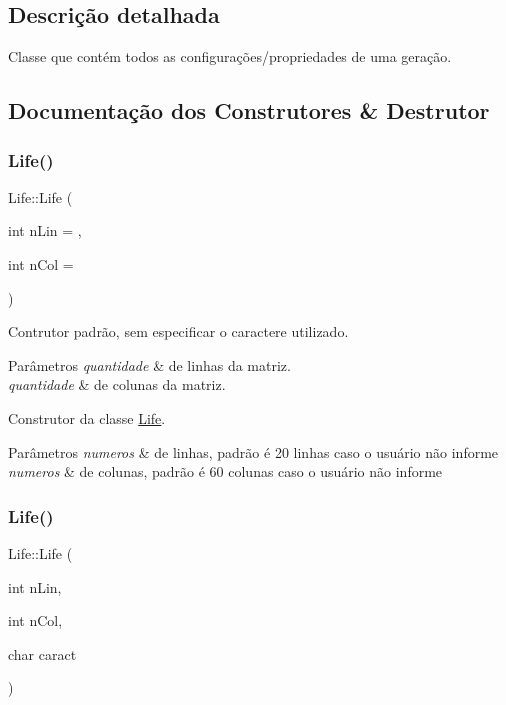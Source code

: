 \subsection{Descrição detalhada}
Classe que contém todos as configurações/propriedades de uma geração. 

\subsection{Documentação dos Construtores \& Destrutor}
\mbox{\label{classLife_a9c54ff69842ec7e1f6195686abd48bfc}} 
\subsubsection{\texorpdfstring{Life()}{Life()}\hspace{0.1cm}{\footnotesize\ttfamily [1/2]}}
{\footnotesize\ttfamily Life\+::\+Life (\begin{DoxyParamCaption}\item[{int}]{n\+Lin = {},  }\item[{int}]{n\+Col = {} }\end{DoxyParamCaption})}

Contrutor padrão, sem especificar o caractere utilizado. 
\begin{DoxyParams}{Parâmetros}
{\em quantidade} & de linhas da matriz. \\
\hline
{\em quantidade} & de colunas da matriz.\\
\hline
\end{DoxyParams}
Construtor da classe \hyperlink{classLife}{Life}. 
\begin{DoxyParams}{Parâmetros}
{\em numeros} & de linhas, padrão é 20 linhas caso o usuário não informe \\
\hline
{\em numeros} & de colunas, padrão é 60 colunas caso o usuário não informe \\
\hline
\end{DoxyParams}
\mbox{\label{classLife_ab1c77136658b414aed166fb5746dd7ef}} 
\subsubsection{\texorpdfstring{Life()}{Life()}\hspace{0.1cm}{\footnotesize\ttfamily [2/2]}}
{\footnotesize\ttfamily Life\+::\+Life (\begin{DoxyParamCaption}\item[{int}]{n\+Lin,  }\item[{int}]{n\+Col,  }\item[{char}]{caract }\end{DoxyParamCaption})}

